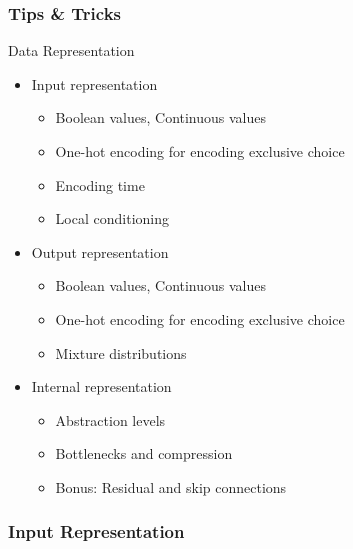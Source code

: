 \documentclass[8pt]{beamer}
\begin{document}
\begin{frame}
\frametitle{Tips \& Tricks}
 \begin{block}{Data Representation}
  \begin{itemize}
   \item Input representation
   \begin{itemize}
    \item Boolean values, Continuous values
    \item One-hot encoding for encoding exclusive choice
    \item Encoding time
    \item Local conditioning
   \end{itemize}
   \item Output representation
   \begin{itemize}
    \item Boolean values, Continuous values
    \item One-hot encoding for encoding exclusive choice
    \item Mixture distributions
   \end{itemize}
   \item Internal representation
   \begin{itemize}
    \item Abstraction levels
    \item Bottlenecks and compression
    \item Bonus: Residual and skip connections
   \end{itemize}
  \end{itemize}
 \end{block}
\end{frame}

\begin{frame}
\frametitle{Input Representation}
\end{frame}
\end{document}

